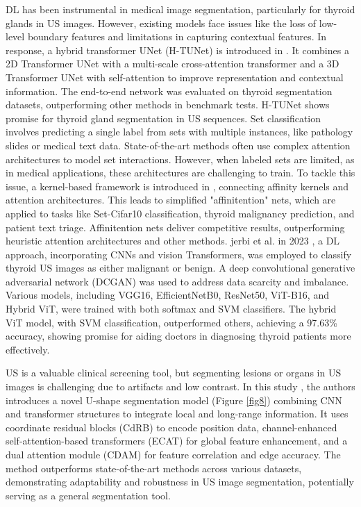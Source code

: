 \documentclass[a4paper,fleqn]{cas-sc}
\begin{document}
\ac{DL} has been instrumental in medical image segmentation, particularly for thyroid glands in \ac{US} images. However, existing models face issues like the loss of low-level boundary features and limitations in capturing contextual features. In response, a hybrid transformer UNet (H-TUNet) is introduced in \cite{chi2023hybrid}. It combines a 2D Transformer UNet with a multi-scale cross-attention transformer and a 3D Transformer UNet with self-attention to improve representation and contextual information. The end-to-end network was evaluated on thyroid segmentation datasets, outperforming other methods in benchmark tests. H-TUNet shows promise for thyroid gland segmentation in \ac{US} sequences. Set classification involves predicting a single label from sets with multiple instances, like pathology slides or medical text data. State-of-the-art methods often use complex attention architectures to model set interactions. However, when labeled sets are limited, as in medical applications, these architectures are challenging to train. To tackle this issue, a kernel-based framework is introduced in \cite{dov2021affinitention}, connecting affinity kernels and attention architectures. This leads to simplified "affinitention" nets, which are applied to tasks like Set-Cifar10 classification, thyroid malignancy prediction, and patient text triage. Affinitention nets deliver competitive results, outperforming heuristic attention architectures and other methods. 
jerbi et al. in 2023 \cite{jerbi2023automatic}, a \ac{DL} approach, incorporating \acp{CNN} and vision Transformers, was employed to classify thyroid \ac{US} images as either malignant or benign. A deep convolutional generative adversarial network (DCGAN) was used to address data scarcity and imbalance. Various models, including VGG16, EfficientNetB0, ResNet50, ViT-B16, and Hybrid ViT, were trained with both softmax and \ac{SVM} classifiers. The hybrid ViT model, with SVM classification, outperformed others, achieving a 97.63\% accuracy, showing promise for aiding doctors in diagnosing thyroid patients more effectively.

\ac{US} is a valuable clinical screening tool, but segmenting lesions or organs in \ac{US} images is challenging due to artifacts and low contrast. In this study \cite{jiang2023hybrid}, the authors introduces a novel U-shape segmentation model (Figure \ref{fig8}) combining CNN and transformer structures to integrate local and long-range information. It uses coordinate residual blocks (CdRB) to encode position data, channel-enhanced self-attention-based transformers (ECAT) for global feature enhancement, and a dual attention module (CDAM) for feature correlation and edge accuracy. The method outperforms state-of-the-art methods across various datasets, demonstrating adaptability and robustness in \ac{US} image segmentation, potentially serving as a general segmentation tool.
\end{document}
